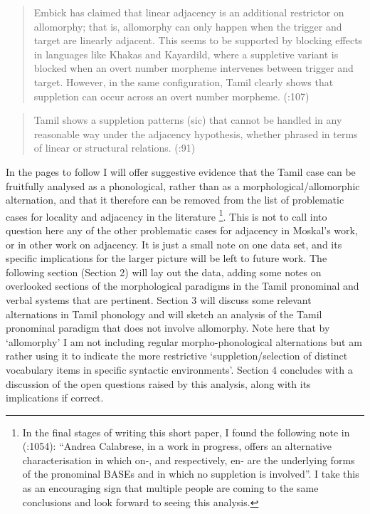\documentclass[output=paper,colorlinks,citecolor=brown,
]{langscibook}
\begin{document}
\begin{quote}
Embick has claimed that linear adjacency is an additional restrictor on allomorphy; that is, allomorphy can only happen when the trigger and target are linearly adjacent. This seems to be supported by blocking effects in languages like Khakas and Kayardild, where a suppletive variant is blocked when an overt number morpheme intervenes between trigger and target. However, in the same configuration, Tamil clearly shows that suppletion can occur across an overt number morpheme. (\citealt{Moskal2015}:107)
\end{quote}
\begin{quote}
Tamil shows a suppletion patterns (sic) that cannot be handled in any reasonable way under the adjacency hypothesis, whether phrased in terms of linear or structural relations. (\citealt{Moskal2015}:91)
\end{quote}

In the pages to follow I will offer suggestive evidence that the Tamil case can be fruitfully analysed as a phonological, rather than as a morphological/allomorphic alternation, and that it therefore can be removed from the list of problematic cases for locality and adjacency in the literature \footnote{In the final stages of writing this short paper, I found the following note in \citeauthor{SmithBobaljik2019} (\citeyear{SmithBobaljik2019}:1054): “Andrea Calabrese, in a work in progress, offers an alternative characterisation in which on-, and respectively, en- are the underlying forms of the pronominal BASEs and in which no suppletion is involved”. I take this as an encouraging sign that multiple people are coming to the same conclusions and look forward to seeing this analysis.}.  This is not to call into question here any of the other problematic cases for adjacency in Moskal’s work, or in other work on adjacency. It is just a small note on one data set, and its specific implications for the larger picture will be left to future work. The following section (Section 2) will lay out the data, adding some notes on overlooked sections of the morphological paradigms in the Tamil pronominal and verbal systems that are pertinent. Section 3 will discuss some relevant alternations in Tamil phonology and will sketch an analysis of the Tamil pronominal paradigm that does not involve allomorphy. Note here that by ‘allomorphy’ I am not including regular morpho-phonological alternations but am rather using it to indicate the more restrictive ‘suppletion/selection of distinct vocabulary items in specific syntactic environments’. Section 4 concludes with a discussion of the open questions raised by this analysis, along with its implications if correct.
\end{document}
